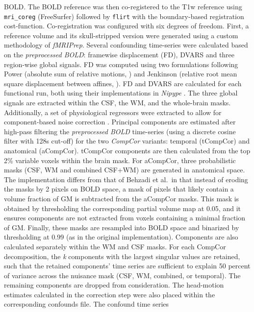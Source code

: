 \documentclass[
]{article}
\begin{document}
\begin{description}
{BOLD}. The BOLD reference was then co-registered to the T1w reference
using \texttt{mri\_coreg} (FreeSurfer) followed by \texttt{flirt}
\citep[FSL 6.0.5.1:57b01774,][]{flirt} with the boundary-based
registration \citep{bbr} cost-function. Co-registration was configured
with six degrees of freedom. First, a reference volume and its
skull-stripped version were generated using a custom methodology of
\emph{fMRIPrep}. Several confounding time-series were calculated based
on the \emph{preprocessed BOLD}: framewise displacement (FD), DVARS and
three region-wise global signals. FD was computed using two formulations
following Power (absolute sum of relative motions,
\citet{power_fd_dvars}) and Jenkinson (relative root mean square
displacement between affines, \citet{mcflirt}). FD and DVARS are
calculated for each functional run, both using their implementations in
\emph{Nipype} \citep[following the definitions by][]{power_fd_dvars}.
The three global signals are extracted within the CSF, the WM, and the
whole-brain masks. Additionally, a set of physiological regressors were
extracted to allow for component-based noise correction
\citep[\emph{CompCor},][]{compcor}. Principal components are estimated
after high-pass filtering the \emph{preprocessed BOLD} time-series
(using a discrete cosine filter with 128s cut-off) for the two
\emph{CompCor} variants: temporal (tCompCor) and anatomical (aCompCor).
tCompCor components are then calculated from the top 2\% variable voxels
within the brain mask. For aCompCor, three probabilistic masks (CSF, WM
and combined CSF+WM) are generated in anatomical space. The
implementation differs from that of Behzadi et al.~in that instead of
eroding the masks by 2 pixels on BOLD space, a mask of pixels that
likely contain a volume fraction of GM is subtracted from the aCompCor
masks. This mask is obtained by thresholding the corresponding partial
volume map at 0.05, and it ensures components are not extracted from
voxels containing a minimal fraction of GM. Finally, these masks are
resampled into BOLD space and binarized by thresholding at 0.99 (as in
the original implementation). Components are also calculated separately
within the WM and CSF masks. For each CompCor decomposition, the
\emph{k} components with the largest singular values are retained, such
that the retained components' time series are sufficient to explain 50
percent of variance across the nuisance mask (CSF, WM, combined, or
temporal). The remaining components are dropped from consideration. The
head-motion estimates calculated in the correction step were also placed
within the corresponding confounds file. The confound time series

\end{description}
\end{document}
